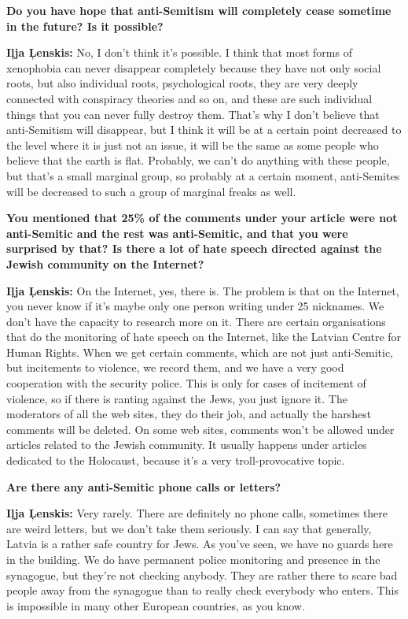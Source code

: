 \textbf{Do you have hope that anti-Semitism will completely cease sometime in the future? Is it possible?} 

\textbf{Iļja Ļenskis:} No, I don’t think it’s possible. I think that most forms of xenophobia can never disappear completely because they have not only social roots, but also individual roots, psychological roots, they are very deeply connected with conspiracy theories and so on, and these are such individual things that you can never fully destroy them. That’s why I don’t believe that anti-Semitism will disappear, but I think it will be at a certain point decreased to the level where it is just not an issue, it will be the same as some people who believe that the earth is flat. Probably, we can’t do anything with these people, but that’s a small marginal group, so probably at a certain moment, anti-Semites will be decreased to such a group of marginal freaks as well. 

\textbf{You mentioned that 25\% of the comments under your article were not anti-Semitic and the rest was anti-Semitic, and that you were surprised  by that? Is there a lot of hate speech directed against the Jewish community on the Internet?} 

\textbf{Iļja Ļenskis:} On the Internet, yes, there is. The problem is that on the Internet, you never know if it's maybe only one person writing under 25 nicknames. We don’t have the capacity to research more on it. There are certain organisations that do the monitoring of hate speech on the Internet, like the Latvian Centre for Human Rights. When we get certain comments, which are not just anti-Semitic, but incitements to violence, we record them, and we have a very good cooperation with the security police. This is only for cases of incitement of violence, so if there is ranting against the Jews, you just ignore it. The moderators of all the web sites, they do their job, and actually the harshest comments will be deleted. On some web sites, comments won't be allowed under articles related to the Jewish community. It usually happens under articles dedicated to the Holocaust, because it's a very troll-provocative topic.

\textbf{Are there any anti-Semitic phone calls or letters?} 

\textbf{Iļja Ļenskis:} Very rarely. There are definitely no phone calls, sometimes there are weird letters, but we don’t take them seriously. I can say that generally, Latvia is a rather safe country for Jews. As you’ve seen, we have no guards here in the building. We do have permanent police monitoring and presence in the synagogue, but they’re not checking anybody. They are rather there to scare bad people away from the synagogue than to really check everybody who enters. This is impossible in many other European countries, as you know.

